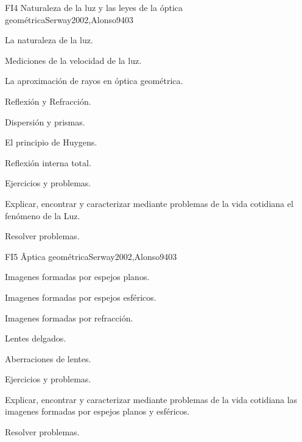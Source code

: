 \begin{syllabus}
\begin{unit}{FI4 Naturaleza de la luz y las leyes de la óptica geométrica}{Serway2002,Alonso94}{0}{3}
\begin{topics}
      \item La naturaleza de la luz.
        \item Mediciones de la velocidad de la luz.
        \item La aproximación de rayos en óptica geométrica.
        \item Reflexión y Refracción.
        \item Dispersión y prismas.
        \item El principio de Huygens.
        \item Reflexión interna total.
        \item Ejercicios y problemas.
   \end{topics}

   \begin{unitgoals}
      \item Explicar, encontrar y caracterizar mediante problemas de la vida cotidiana el fenómeno de la Luz.
      \item Resolver problemas.
      \end{unitgoals}
\end{unit}

\begin{unit}{FI5 Ãptica geométrica}{Serway2002,Alonso94}{0}{3}
\begin{topics}
      \item Imagenes formadas por espejos planos.
        \item Imagenes formadas por espejos esféricos.
        \item Imagenes formadas por refracción.
        \item Lentes delgados.
        \item Aberraciones de lentes.
        \item Ejercicios y problemas.
      \end{topics}

   \begin{unitgoals}
      \item Explicar, encontrar y caracterizar mediante problemas de la vida cotidiana las imagenes formadas por espejos planos y esféricos.
      \item Resolver problemas.
   \end{unitgoals}
\end{unit}


\end{syllabus}

